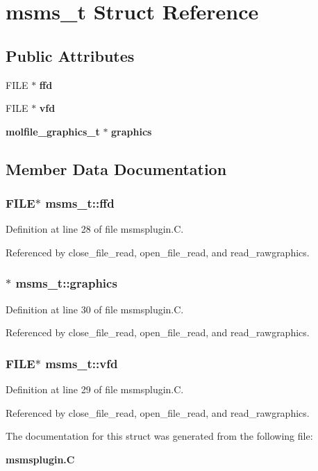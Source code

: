 \section{msms\_\-t  Struct Reference}
\label{structmsms__t}
\subsection*{Public Attributes}
\begin{CompactItemize}
\item 
FILE $\ast$ {\bf ffd}
\item 
FILE $\ast$ {\bf vfd}
\item 
{\bf molfile\_\-graphics\_\-t} $\ast$ {\bf graphics}
\end{CompactItemize}


\subsection{Member Data Documentation}
\subsubsection{\setlength{\rightskip}{0pt plus 5cm}FILE$\ast$ msms\_\-t::ffd}\label{structmsms__t_m0}




Definition at line 28 of file msmsplugin.C.

Referenced by close\_\-file\_\-read, open\_\-file\_\-read, and read\_\-rawgraphics.
\subsubsection{$\ast$ msms\_\-t::graphics}\label{structmsms__t_m2}




Definition at line 30 of file msmsplugin.C.

Referenced by close\_\-file\_\-read, open\_\-file\_\-read, and read\_\-rawgraphics.
\subsubsection{\setlength{\rightskip}{0pt plus 5cm}FILE$\ast$ msms\_\-t::vfd}\label{structmsms__t_m1}




Definition at line 29 of file msmsplugin.C.

Referenced by close\_\-file\_\-read, open\_\-file\_\-read, and read\_\-rawgraphics.

The documentation for this struct was generated from the following file:\begin{CompactItemize}
\item 
{\bf msmsplugin.C}\end{CompactItemize}
